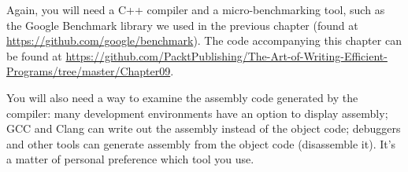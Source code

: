 Again, you will need a C++ compiler and a micro-benchmarking tool, such as the Google Benchmark library we used in the previous chapter (found at \url{https://github.com/google/benchmark}). The code accompanying this chapter can be found at \url{https://github.com/PacktPublishing/The-Art-of-Writing-Efficient-Programs/tree/master/Chapter09}.

You will also need a way to examine the assembly code generated by the compiler: many development environments have an option to display assembly; GCC and Clang can write out the assembly instead of the object code; debuggers and other tools can generate assembly from the object code (disassemble it). It's a matter of personal preference which tool you use.